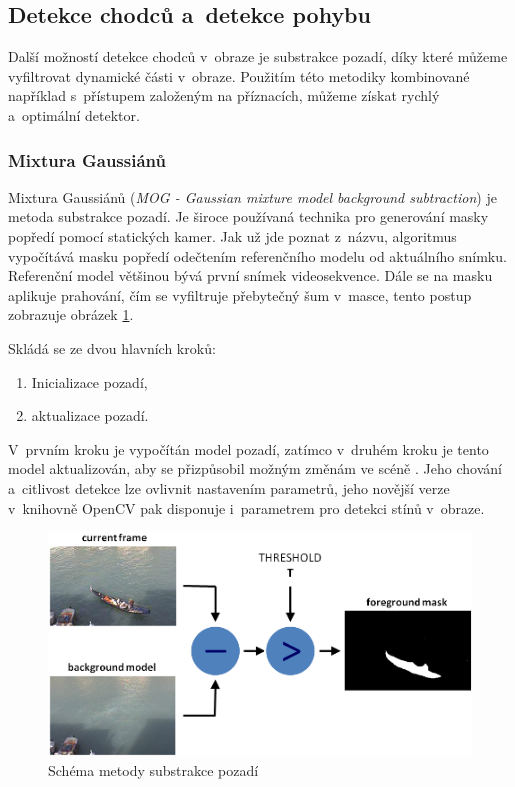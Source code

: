 \subsection{Detekce chodců a~detekce pohybu} %
Další možností detekce chodců v~obraze je substrakce pozadí, díky které můžeme vyfiltrovat dynamické části v~obraze. Použitím této metodiky kombinované například s~přístupem založeným na příznacích, můžeme získat rychlý a~optimální detektor.

\subsubsection*{Mixtura Gaussiánů}
Mixtura Gaussiánů (\textit{MOG - Gaussian mixture model background subtraction}) \cite{mog:zivkovic} je metoda substrakce pozadí. Je široce používaná technika pro generování masky popředí pomocí statických kamer. Jak už jde poznat z~názvu, algoritmus vypočítává masku popředí odečtením referenčního modelu od aktuálního snímku. Referenční model většinou bývá první snímek videosekvence. Dále se na masku aplikuje prahování, čím se vyfiltruje přebytečný šum v~masce, tento postup zobrazuje obrázek \ref{mog_scheme}.

Skládá se ze dvou hlavních kroků:
 \begin{enumerate}
    \item{Inicializace pozadí,}
    \item{aktualizace pozadí.}
 \end{enumerate}
 V~prvním kroku je vypočítán model pozadí, zatímco v~druhém kroku je tento model aktualizován, aby se přizpůsobil možným změnám ve scéně \cite{openCV:MOG}.
Jeho chování a~citlivost detekce lze ovlivnit nastavením parametrů, jeho novější verze v~knihovně OpenCV pak disponuje i~parametrem pro detekci stínů v~obraze.
\begin{figure}[H]
  \centering
  \includegraphics[width=14cm]{figures/mog_scheme}
  \caption{Schéma metody substrakce pozadí \cite{openCV:MOG}}
  \label{mog_scheme}
\end{figure}

